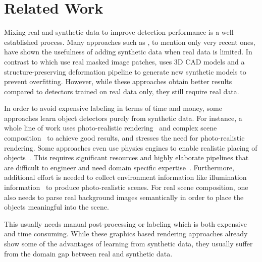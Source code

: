 \documentclass[10pt,twocolumn,letterpaper]{article}
\newcommand{\stefanrmk}[1]{{\color{DarkRed}\bf #1}}
\begin{document}
\section{Related Work}
\label{sec:related_work}

Mixing real  and synthetic data to improve detection  performance is a
well      established      process.       Many      approaches      such      as
\cite{Dwibedi17,Georgakis17,Su15}, to mention only  very recent ones, have shown
the usefulness of  adding synthetic data when real data  is limited. In contrast
to \cite{Dwibedi17,Georgakis17} which use real masked image patches, \cite{Su15}
uses 3D CAD  models and a structure-preserving deformation  pipeline to generate
new  synthetic models  to prevent  overfitting.  However,  while these
approaches  obtain better  results compared  to detectors  trained on  real data
only, they still require real data.



In order to avoid expensive labeling in terms of time and money, some approaches
learn object detectors purely from synthetic data.  For instance, a whole line of
work uses  photo-realistic rendering~\cite{Alhaija17,Gupta16} and  complex scene
composition~\cite{Gupta16, Alhaija17, Georgakis17, Varol17}  to achieve
good   results,   and   \cite{MovshovitzAttias16}    stresses   the   need   for
photo-realistic rendering.  Some  approaches even use physics  engines to enable
realistic  placing   of  objects~\cite{Mitash17}.   This   requires  significant
resources and highly elaborate pipelines that are difficult to engineer and need
domain  specific  expertise~\cite{Richter_2016_ECCV}.   Furthermore,  additional
effort  is   needed  to   collect  environment  information   like  illumination
information~\cite{Alhaija17} to produce photo-realistic  scenes.  For real scene
composition,  one also  needs to  parse real  background images  semantically in
order to place the objects meaningful into the scene.


This usually  needs manual post-processing  or labeling which is  both expensive
and time  consuming.  While  these graphics  based rendering  approaches already
show some of the advantages of learning from synthetic data, they usually suffer
from the domain gap between real and synthetic data.
\end{document}
